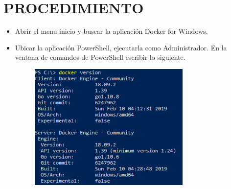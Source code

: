 \section{PROCEDIMIENTO} 

\begin{itemize}
\subsection{Parte 1: Iniciando Docker}
	\item Abrir el menu inicio y buscar la aplicación Docker for Windows.

	\item Ubicar la aplicación PowerShell, ejecutarla como Administrador. En la ventana de comandos de PowerShell escribir
lo siguiente.
		\begin{figure}[H]
		\begin{center}
		\includegraphics[width=8cm]{./Imagenes/1}
		\end{center}
		\end{figure}
     

\end{itemize}
